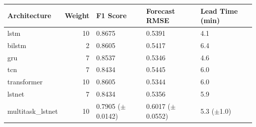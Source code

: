 \begin{tabular}{lrlll}
\toprule
Architecture & Weight & F1 Score & Forecast RMSE & Lead Time (min) \\
\midrule
lstm & 10 & 0.8675 & 0.5391 & 4.1 \\
bilstm & 2 & 0.8605 & 0.5417 & 6.4 \\
gru & 7 & 0.8537 & 0.5346 & 4.6 \\
tcn & 7 & 0.8434 & 0.5445 & 6.0 \\
transformer & 10 & 0.8605 & 0.5344 & 6.0 \\
lstnet & 7 & 0.8434 & 0.5356 & 5.9 \\
multitask_lstnet & 10 & 0.7905 ($\pm$0.0142) & 0.6017 ($\pm$0.0552) & 5.3 ($\pm$1.0) \\
\bottomrule
\end{tabular}
